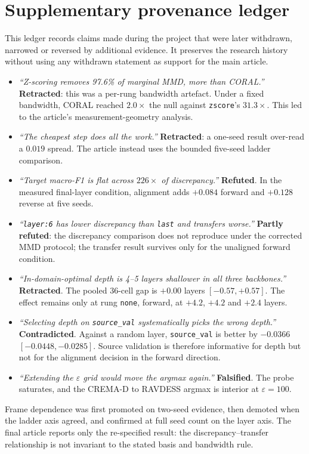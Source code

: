 \documentclass[a4paper,fleqn]{cas-dc}
\begin{document}

\section*{Supplementary provenance ledger}

This ledger records claims made during the project that were later withdrawn,
narrowed or reversed by additional evidence. It preserves the research history
without using any withdrawn statement as support for the main article.

\begin{itemize}
  \item \emph{``Z-scoring removes 97.6\% of marginal MMD, more than CORAL.''}
    \textbf{Retracted}: this was a per-rung bandwidth artefact. Under a fixed
    bandwidth, CORAL reached $2.0\times$ the null against \texttt{zscore}'s
    $31.3\times$. This led to the article's measurement-geometry analysis.
  \item \emph{``The cheapest step does all the work.''} \textbf{Retracted}:
    a one-seed result over-read a $0.019$ spread. The article instead uses the
    bounded five-seed ladder comparison.
  \item \emph{``Target macro-F1 is flat across $226\times$ of discrepancy.''}
    \textbf{Refuted}. In the measured final-layer condition, alignment adds
    $+0.084$ forward and $+0.128$ reverse at five seeds.
  \item \emph{``\texttt{layer:6} has lower discrepancy than \texttt{last} and
    transfers worse.''} \textbf{Partly refuted}: the discrepancy comparison
    does not reproduce under the corrected MMD protocol; the transfer result
    survives only for the unaligned forward condition.
  \item \emph{``In-domain-optimal depth is 4--5 layers shallower in all three
    backbones.''} \textbf{Retracted}. The pooled 36-cell gap is $+0.00$ layers
    $[-0.57, +0.57]$. The effect remains only at rung \texttt{none}, forward,
    at $+4.2$, $+4.2$ and $+2.4$ layers.
  \item \emph{``Selecting depth on \texttt{source\_val} systematically picks
    the wrong depth.''} \textbf{Contradicted}. Against a random layer,
    \texttt{source\_val} is better by $-0.0366$ $[-0.0448, -0.0285]$.
    Source validation is therefore informative for depth but not for the
    alignment decision in the forward direction.
  \item \emph{``Extending the $\varepsilon$ grid would move the argmax
    again.''} \textbf{Falsified}. The probe saturates, and the CREMA-D to
    RAVDESS argmax is interior at $\varepsilon = 100$.
\end{itemize}

Frame dependence was first promoted on two-seed evidence, then demoted when
the ladder axis agreed, and confirmed at full seed count on the layer axis.
The final article reports only the re-specified result: the
discrepancy--transfer relationship is not invariant to the stated basis and
bandwidth rule.
\end{document}
